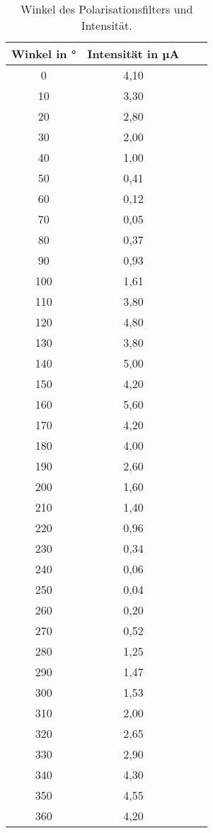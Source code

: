     \begin{table}
      \centering
      \begin{tabular}{c c c c}
        \toprule
        Winkel in ° & Intensität in µA\\
        \midrule
          0   &  4,10 \\
          10   &  3,30\\
          20   &  2,80\\
          30   &  2,00\\
          40   &  1,00\\
          50   &  0,41\\
          60   &  0,12\\
          70   &  0,05\\
          80   &  0,37\\
          90   &  0,93\\
          100   &  1,61\\
          110   &  3,80\\
          120   &  4,80\\
          130   &  3,80\\
          140   &  5,00\\
          150   &  4,20\\
          160   &  5,60\\
          170   &  4,20\\
          180   &  4,00\\
          190   &  2,60\\
          200   &  1,60\\
          210   &  1,40\\
          220   &  0,96\\
          230   &  0,34\\
          240   &  0,06\\
          250   &  0,04\\
          260   &  0,20\\
          270   &  0,52\\
          280   &  1,25\\
          290   &  1,47\\
          300   &  1,53\\
          310   &  2,00\\
          320   &  2,65\\
          330   &  2,90\\
          340   &  4,30\\
          350   &  4,55\\
          360   &  4,20\\
        \bottomrule
      \end{tabular}
      \caption{Winkel des Polarisationsfilters und Intensität.}
      \label{tab:polarisation}
    \end{table}



